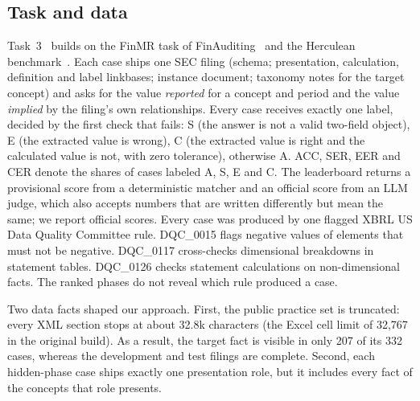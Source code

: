 \documentclass[conference]{IEEEtran}
\begin{document}
\subsection{Task and data}
Task~3~\cite{finreason2026task3overview} builds on the FinMR task of FinAuditing~\cite{wang2026finauditing} and the
Herculean benchmark~\cite{peng2026herculeanagenticbenchmarkfinancial}. Each case ships one SEC filing (schema;
presentation, calculation, definition and label linkbases; instance document; taxonomy notes for the target concept)
and asks for the value \emph{reported} for a concept and period and the value \emph{implied} by the filing's own
relationships. Every case receives exactly one label, decided by the first check that fails: S (the answer is not a
valid two-field object), E (the extracted value is wrong), C (the extracted value is right and the calculated value is
not, with zero tolerance), otherwise A. ACC, SER, EER and CER denote the shares of cases labeled A, S, E and C. The
leaderboard returns a provisional score from a deterministic matcher and an official score from an LLM judge, which
also accepts numbers that are written differently but mean the same; we report official scores. Every case was
produced by one flagged XBRL US Data Quality Committee rule.
DQC\_0015 flags negative values of elements that must not be negative. DQC\_0117 cross-checks dimensional breakdowns in
statement tables. DQC\_0126 checks statement calculations on non-dimensional facts. The ranked phases do not reveal
which rule produced a case.

Two data facts shaped our approach. First, the public practice set is truncated: every XML section stops at about
32.8k characters (the Excel cell limit of 32{,}767 in the original build). As a result, the target fact is visible in only
207 of its 332 cases, whereas the development and test filings are complete. Second, each hidden-phase case ships
exactly one presentation role, but it includes every fact of the concepts that role presents.
\end{document}
